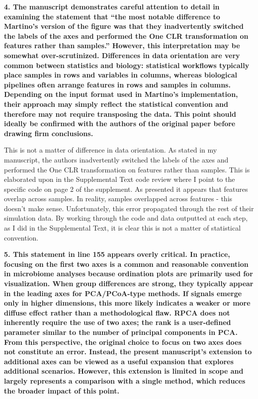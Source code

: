 \documentclass[
  11pt,
]{article}
\begin{document}
\textbf{4. The manuscript demonstrates careful attention to detail in
examining the statement that ``the most notable difference to Martino's
version of the figure was that they inadvertently switched the labels of
the axes and performed the One CLR transformation on features rather
than samples.'' However, this interpretation may be somewhat
over-scrutinized. Differences in data orientation are very common
between statistics and biology: statistical workflows typically place
samples in rows and variables in columns, whereas biological pipelines
often arrange features in rows and samples in columns. Depending on the
input format used in Martino's implementation, their approach may simply
reflect the statistical convention and therefore may not require
transposing the data. This point should ideally be confirmed with the
authors of the original paper before drawing firm conclusions.}

This is not a matter of difference in data orientation. As stated in my
manuscript, the authors inadvertently switched the labels of the axes
and performed the One CLR transformation on features rather than
samples. This is elaborated upon in the Supplemental Text code review
where I point to the specific code on page 2 of the supplement. As
presented it appears that features overlap across samples. In reality,
samples overlapped across features - this doesn't make sense.
Unfortunately, this error propagated through the rest of their
simulation data. By working through the code and data outputted at each
step, as I did in the Supplemental Text, it is clear this is not a
matter of statistical convention.

\textbf{5. This statement in line 155 appears overly critical. In
practice, focusing on the first two axes is a common and reasonable
convention in microbiome analyses because ordination plots are primarily
used for visualization. When group differences are strong, they
typically appear in the leading axes for PCA/PCoA-type methods. If
signals emerge only in higher dimensions, this more likely indicates a
weaker or more diffuse effect rather than a methodological flaw. RPCA
does not inherently require the use of two axes; the rank is a
user-defined parameter similar to the number of principal components in
PCA. From this perspective, the original choice to focus on two axes
does not constitute an error. Instead, the present manuscript's
extension to additional axes can be viewed as a useful expansion that
explores additional scenarios. However, this extension is limited in
scope and largely represents a comparison with a single method, which
reduces the broader impact of this point.}
\end{document}
